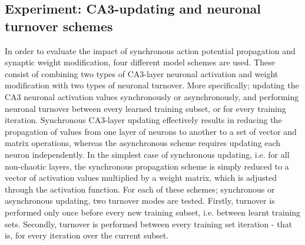\subsection{Experiment: CA3-updating and neuronal turnover schemes}

In order to evaluate the impact of synchronous action potential propagation and synaptic weight modification, four different model schemes are used. These consist of combining two types of CA3-layer neuronal activation and weight modification with two types of neuronal turnover. More specifically; updating the CA3 neuronal activation values synchronously or asynchronously, and performing neuronal turnover between every learned training subset, or for every training iteration. Synchronous CA3-layer updating effectively results in reducing the propagation of values from one layer of neurons to another to a set of vector and matrix operations, whereas the asynchronous scheme requires updating each neuron independently. In the simplest case of synchronous updating, i.e. for all non-chaotic layers, the synchronous propagation scheme is simply reduced to a vector of activation values multiplied by a weight matrix, which is adjusted through the activation function. For each of these schemes; synchronous or asynchronous updating, two turnover modes are tested. Firstly, turnover is performed only once before every new training subset, i.e. between learnt training sets. Secondly, turnover is performed between every training set iteration - that is, for every iteration over the current subset.

